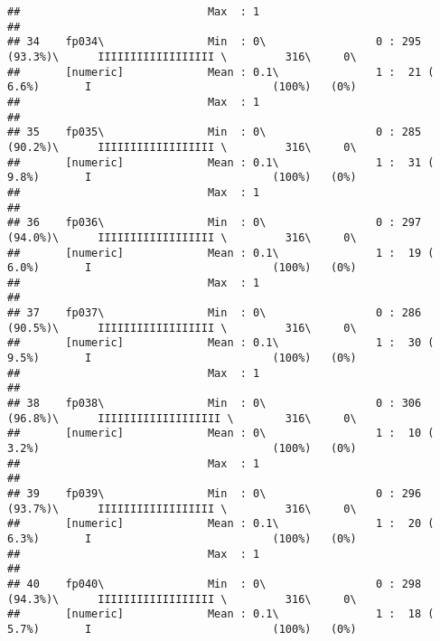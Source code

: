 \documentclass[]{article}
\begin{document}
\begin{verbatim}
##                             Max  : 1                                                                                       
## 
## 34    fp034\                Min  : 0\                 0 : 295 (93.3%)\      IIIIIIIIIIIIIIIIII \         316\     0\       
##       [numeric]             Mean : 0.1\               1 :  21 ( 6.6%)       I                            (100%)   (0%)     
##                             Max  : 1                                                                                       
## 
## 35    fp035\                Min  : 0\                 0 : 285 (90.2%)\      IIIIIIIIIIIIIIIIII \         316\     0\       
##       [numeric]             Mean : 0.1\               1 :  31 ( 9.8%)       I                            (100%)   (0%)     
##                             Max  : 1                                                                                       
## 
## 36    fp036\                Min  : 0\                 0 : 297 (94.0%)\      IIIIIIIIIIIIIIIIII \         316\     0\       
##       [numeric]             Mean : 0.1\               1 :  19 ( 6.0%)       I                            (100%)   (0%)     
##                             Max  : 1                                                                                       
## 
## 37    fp037\                Min  : 0\                 0 : 286 (90.5%)\      IIIIIIIIIIIIIIIIII \         316\     0\       
##       [numeric]             Mean : 0.1\               1 :  30 ( 9.5%)       I                            (100%)   (0%)     
##                             Max  : 1                                                                                       
## 
## 38    fp038\                Min  : 0\                 0 : 306 (96.8%)\      IIIIIIIIIIIIIIIIIII \        316\     0\       
##       [numeric]             Mean : 0\                 1 :  10 ( 3.2%)                                    (100%)   (0%)     
##                             Max  : 1                                                                                       
## 
## 39    fp039\                Min  : 0\                 0 : 296 (93.7%)\      IIIIIIIIIIIIIIIIII \         316\     0\       
##       [numeric]             Mean : 0.1\               1 :  20 ( 6.3%)       I                            (100%)   (0%)     
##                             Max  : 1                                                                                       
## 
## 40    fp040\                Min  : 0\                 0 : 298 (94.3%)\      IIIIIIIIIIIIIIIIII \         316\     0\       
##       [numeric]             Mean : 0.1\               1 :  18 ( 5.7%)       I                            (100%)   (0%)     

\end{verbatim}
\end{document}
